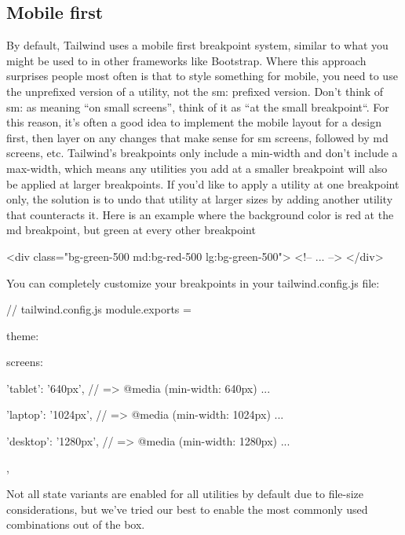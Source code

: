 \documentclass{report}
\begin{document}
    \subsection{Mobile first}
    \bigbreak \noindent 
    By default, Tailwind uses a mobile first breakpoint system, similar to what you might be used to in other frameworks like Bootstrap.
    \bigbreak \noindent 
    Where this approach surprises people most often is that to style something for mobile, you need to use the unprefixed version of a utility, not the sm: prefixed version. Don’t think of sm: as meaning “on small screens”, think of it as “at the small breakpoint“.
    \bigbreak \noindent 
    For this reason, it’s often a good idea to implement the mobile layout for a design first, then layer on any changes that make sense for sm screens, followed by md screens, etc.
    \bigbreak \noindent 
    Tailwind’s breakpoints only include a min-width and don’t include a max-width, which means any utilities you add at a smaller breakpoint will also be applied at larger breakpoints.
    \bigbreak \noindent 
    If you’d like to apply a utility at one breakpoint only, the solution is to undo that utility at larger sizes by adding another utility that counteracts it.
    \bigbreak \noindent 
    Here is an example where the background color is red at the md breakpoint, but green at every other breakpoint
    \bigbreak \noindent 
    \begin{htmlcode}
        <div class="bg-green-500 md:bg-red-500 lg:bg-green-500">
          <!-- ... -->
        </div>
    \end{htmlcode}
    \bigbreak \noindent 
    You can completely customize your breakpoints in your tailwind.config.js file:
    \bigbreak \noindent 
    \begin{cppcode}
 // tailwind.config.js
module.exports = {
  theme: {
    screens: {
      'tablet': '640px',
      // => @media (min-width: 640px) { ... }

      'laptop': '1024px',
      // => @media (min-width: 1024px) { ... }

      'desktop': '1280px',
      // => @media (min-width: 1280px) { ... }
    },
  }
}   
    \end{cppcode}

    \pagebreak 
    \bigbreak \noindent 
    Not all state variants are enabled for all utilities by default due to file-size considerations, but we’ve tried our best to enable the most commonly used combinations out of the box.
    \bigbreak \noindent 
\end{document}
